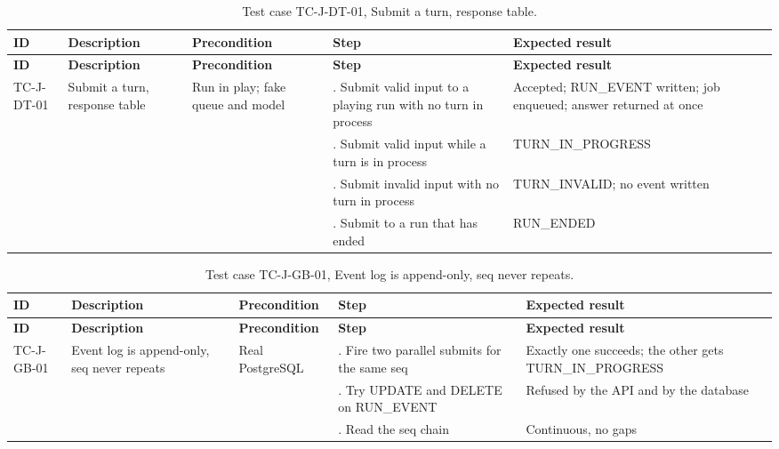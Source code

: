 {\small
\begin{longtable}{|>{\raggedright\arraybackslash}p{}|>{\raggedright\arraybackslash}p{}|>{\raggedright\arraybackslash}p{}|>{\raggedright\arraybackslash}p{}|>{\raggedright\arraybackslash}p{}|}
\caption{Test case TC-J-DT-01, Submit a turn, response table.} \\
\hline
\textbf{ID} & \textbf{Description} & \textbf{Precondition} & \textbf{Step} & \textbf{Expected result} \\ \hline
\endfirsthead
\hline
\textbf{ID} & \textbf{Description} & \textbf{Precondition} & \textbf{Step} & \textbf{Expected result} \\ \hline
\endhead
TC-J-DT-01 & Submit a turn, response table & Run in play; fake queue and model & 1. Submit valid input to a playing run with no turn in process & Accepted; RUN\_EVENT written; job enqueued; answer returned at once \\ \hline
 &  &  & 2. Submit valid input while a turn is in process & TURN\_IN\_PROGRESS \\ \hline
 &  &  & 3. Submit invalid input with no turn in process & TURN\_INVALID; no event written \\ \hline
 &  &  & 4. Submit to a run that has ended & RUN\_ENDED \\ \hline
\end{longtable}
}

{\small
\begin{longtable}{|>{\raggedright\arraybackslash}p{}|>{\raggedright\arraybackslash}p{}|>{\raggedright\arraybackslash}p{}|>{\raggedright\arraybackslash}p{}|>{\raggedright\arraybackslash}p{}|}
\caption{Test case TC-J-GB-01, Event log is append-only, seq never repeats.} \\
\hline
\textbf{ID} & \textbf{Description} & \textbf{Precondition} & \textbf{Step} & \textbf{Expected result} \\ \hline
\endfirsthead
\hline
\textbf{ID} & \textbf{Description} & \textbf{Precondition} & \textbf{Step} & \textbf{Expected result} \\ \hline
\endhead
TC-J-GB-01 & Event log is append-only, seq never repeats & Real PostgreSQL & 1. Fire two parallel submits for the same seq & Exactly one succeeds; the other gets TURN\_IN\_PROGRESS \\ \hline
 &  &  & 2. Try UPDATE and DELETE on RUN\_EVENT & Refused by the API and by the database \\ \hline
 &  &  & 3. Read the seq chain & Continuous, no gaps \\ \hline
\end{longtable}
}

